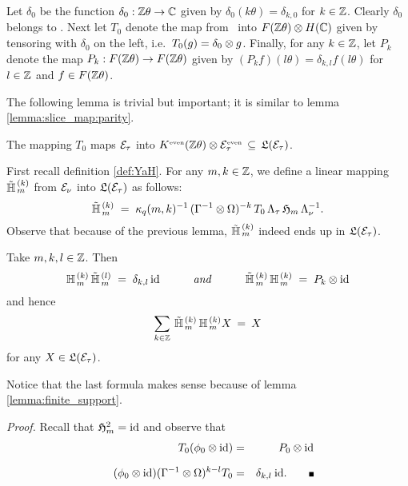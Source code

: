 

\begin{defn_sec}
Let $\delta_0$ be the function $\delta_0: \Zt \rarr \CC$ given by
$\delta_0(k\theta)=\delta_{k,0}$ for $k\in\ZZ$. Clearly $\delta_0$ belongs to
\KZeven\@. Next let $T_0$ denote the map from \HC\ into $\FZ \tens \HC$ given
by tensoring with $\delta_0$ on the left, i.e.\ $T_0(g)=\delta_0 \tens g$.
Finally, for any $k\in\ZZ$, let $P_k$ denote the map $P_k : \FZ \rarr \FZ$
given by  $(P_k f)(l\theta)=\delta_{k,l} f(l\theta)$ for $l\in\ZZ$ and
$f\in\FZ$.
\end{defn_sec}


The following lemma is trivial but important;
it is similar to lemma \ref{lemma:slice_map:parity}\@.


\begin{lemma_sec} \label{lemma:T_0:parity}
The mapping\/ $T_0$ maps\/ $\Hcore_\tau$ into\/
$\KZeven \tens \Hcore_\tau^\scripteven \, \subseteq \, \calL(\Hcore_\tau)$.
\end{lemma_sec}



\begin{defn_sec}  \label{def:Htil}
First recall definition \ref{def:YaH}\@.
For any $m,k\in\ZZ$, we define a linear mapping $\Htil{m}{k}$
from $\Hcore_\nu$ into $\calL(\Hcore_\tau)$ as follows:
$$ \Htil{m}{k} \;=\;
   \kq(m,k)^{-1} \, (\Gamma^{-1} \tens \Omega)^{-k}\,
                T_0\, \Lambda_\tau \, \holH{m} \, \Lambda_\nu^{-1}. $$
Observe that because of the previous lemma, $\Htil{m}{k}$ indeed ends up in
$\calL(\Hcore_\tau)$.
\end{defn_sec}




\begin{lemma_sec}
Take\/ $m,k,l\in\ZZ$. Then
$$ \YaH{m}{k} \,\Htil{m}{l} \;=\; \delta_{k,l} \,\id
        \itandspace{3em}
   \Htil{m}{k} \,\YaH{m}{k} \;=\; P_k \tens \id$$
and hence
$$ \sum_{k\in\ZZ}\: \Htil{m}{k}\, \YaH{m}{k} X  \:=\: X $$
for any\/ $X\in \calL(\Hcore_\tau)$.
\end{lemma_sec}
Notice that the last formula makes sense because of lemma \ref{lemma:finite_support}\@.
\vspace{1ex}

{\em Proof.}
Recall that $\holH{m}^{2} = \id$ and observe that
\begin{eqnarray*}
      T_0 (\evzero \tens \id)  &=&  P_0 \tens \id
\\
\vertXL\hspace{1em}
        (\evzero \tens \id) (\Gamma^{-1} \tens \Omega)^{k-l}T_0
             &=& \delta_{k,l} \: \id.   \hspace{2em} \qed
\end{eqnarray*}





